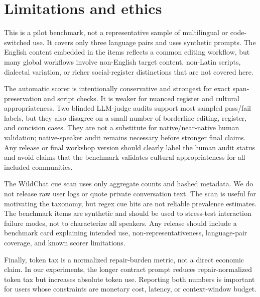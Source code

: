 \section{Limitations and ethics}

This is a pilot benchmark, not a representative sample of multilingual or
code-switched use. It covers only three language pairs and uses synthetic
prompts. The English content embedded in the items reflects a common editing
workflow, but many global workflows involve non-English target content,
non-Latin scripts, dialectal variation, or richer social-register distinctions
that are not covered here.

The automatic scorer is intentionally conservative and strongest for exact
span-preservation and script checks. It is weaker for nuanced register and
cultural appropriateness. Two blinded LLM-judge audits support most sampled
pass/fail labels, but they also disagree on a small number of borderline
editing, register, and concision cases. They are not a substitute for
native/near-native human validation; native-speaker audit remains necessary
before stronger final claims. Any release or final workshop version should
clearly label the human audit status and avoid claims that the benchmark
validates cultural appropriateness for all included communities.

The WildChat cue scan uses only aggregate counts and hashed metadata. We do not
release raw user logs or quote private conversation text. The scan is useful for
motivating the taxonomy, but regex cue hits are not reliable prevalence
estimates. The benchmark items are synthetic and should be used to stress-test
interaction failure modes, not to characterize all speakers. Any release should
include a benchmark card explaining intended use, non-representativeness,
language-pair coverage, and known scorer limitations.

Finally, token tax is a normalized repair-burden metric, not a direct economic
claim. In our experiments, the longer contract prompt reduces repair-normalized
token tax but increases absolute token use. Reporting both numbers is important
for users whose constraints are monetary cost, latency, or context-window
budget.
